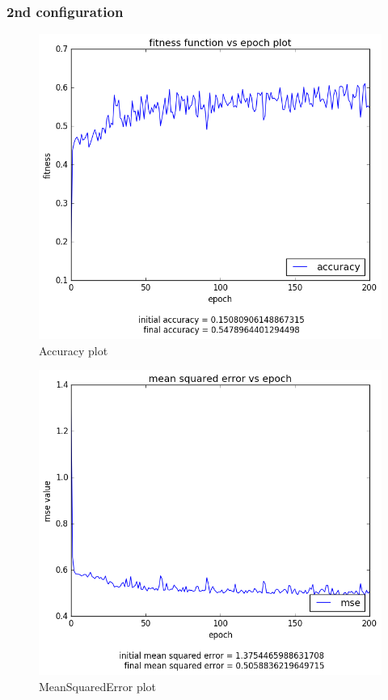 \documentclass[12pt,a4paper]{article}
\begin{document}
\subsubsection{2nd configuration}
\begin{figure}[H]
\centering
\includegraphics[scale=0.4]{img/8_acc_2.png}
\caption{Accuracy plot}
\end{figure}
\begin{figure}[H]
\centering
\includegraphics[scale=0.4]{img/8_mse_2.png}
\caption{MeanSquaredError plot}
\end{figure}
\end{document}
